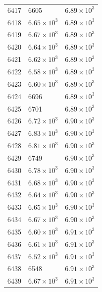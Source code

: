 \begin{table}[H]
\begin{tabular}{lll}
6417 & 6605 & $\displaystyle 6.89 \times 10^{3}$ \\
6418 & $\displaystyle 6.65 \times 10^{3}$ & $\displaystyle 6.89 \times 10^{3}$ \\
6419 & $\displaystyle 6.67 \times 10^{3}$ & $\displaystyle 6.89 \times 10^{3}$ \\
6420 & $\displaystyle 6.64 \times 10^{3}$ & $\displaystyle 6.89 \times 10^{3}$ \\
6421 & $\displaystyle 6.62 \times 10^{3}$ & $\displaystyle 6.89 \times 10^{3}$ \\
6422 & $\displaystyle 6.58 \times 10^{3}$ & $\displaystyle 6.89 \times 10^{3}$ \\
6423 & $\displaystyle 6.60 \times 10^{3}$ & $\displaystyle 6.89 \times 10^{3}$ \\
6424 & 6696 & $\displaystyle 6.89 \times 10^{3}$ \\
6425 & 6701 & $\displaystyle 6.89 \times 10^{3}$ \\
6426 & $\displaystyle 6.72 \times 10^{3}$ & $\displaystyle 6.90 \times 10^{3}$ \\
6427 & $\displaystyle 6.83 \times 10^{3}$ & $\displaystyle 6.90 \times 10^{3}$ \\
6428 & $\displaystyle 6.81 \times 10^{3}$ & $\displaystyle 6.90 \times 10^{3}$ \\
6429 & 6749 & $\displaystyle 6.90 \times 10^{3}$ \\
6430 & $\displaystyle 6.78 \times 10^{3}$ & $\displaystyle 6.90 \times 10^{3}$ \\
6431 & $\displaystyle 6.68 \times 10^{3}$ & $\displaystyle 6.90 \times 10^{3}$ \\
6432 & $\displaystyle 6.64 \times 10^{3}$ & $\displaystyle 6.90 \times 10^{3}$ \\
6433 & $\displaystyle 6.65 \times 10^{3}$ & $\displaystyle 6.90 \times 10^{3}$ \\
6434 & $\displaystyle 6.67 \times 10^{3}$ & $\displaystyle 6.90 \times 10^{3}$ \\
6435 & $\displaystyle 6.60 \times 10^{3}$ & $\displaystyle 6.91 \times 10^{3}$ \\
6436 & $\displaystyle 6.61 \times 10^{3}$ & $\displaystyle 6.91 \times 10^{3}$ \\
6437 & $\displaystyle 6.52 \times 10^{3}$ & $\displaystyle 6.91 \times 10^{3}$ \\
6438 & 6548 & $\displaystyle 6.91 \times 10^{3}$ \\
6439 & $\displaystyle 6.67 \times 10^{3}$ & $\displaystyle 6.91 \times 10^{3}$ \\

\end{tabular}
\end{table}
